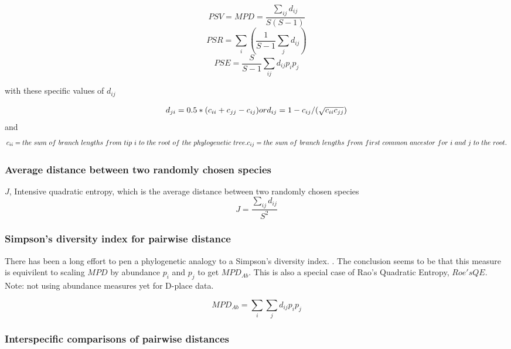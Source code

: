\documentclass[]{book}
\theoremstyle{definition}
\theoremstyle{definition}
\theoremstyle{remark}
\begin{document}
\[PSV = MPD = \dfrac{\sum_{ij} d_{ij}}{S(S-1)}\]
\[PSR = \sum_{i} {(\dfrac{1}{S-1} \sum_{j} {d_{ij}})}\]
\[PSE = \dfrac{S}{S-1} \sum_{ij} d_{ij}p_{i}p_{j}\]

with these specific values of \(d_{ij}\)

\[
d_{ji}=0.5*(c_{ii} + c_{jj} - c_{ij}) \\ 
\ \\
or \\
\ \\
d_{ij} = 1 - c_{ij} / (\sqrt{c_{ii}c_{jj}}) 
\] and \[
c_{ii} = the \ sum \ of \ branch \ lengths \ from \ tip \ i  \ to \ the \ root \ of \ the \ phylogenetic \ tree. \\
\ \\
c_{ij} = the \ sum \  of \ branch \ lengths \ from \ first \ common \ ancestor \ for \ i \ and \ j \ to \ the \ root.
\]

\subsubsection{Average distance between two randomly chosen
species}\label{average-distance-between-two-randomly-chosen-species}

\(J\), Intensive quadratic entropy, which is the average distance
between two randomly chosen species \citep{Izsak2000}
\[J = \dfrac{\sum_{ij}d_{ij}}{S^2} \]

\subsubsection{Simpson's diversity index for pairwise
distance}\label{simpsons-diversity-index-for-pairwise-distance}

There has been a long effort to pen a phylogenetic analogy to a
Simpson's diversity index.
\citep{Rao1982, Clarke1998, Pavoine2005, Hardy2007, Webb2002, Webb2008, Kembel2010}.
The conclusion seems to be that this measure is equivilent to scaling
\(MPD\) by abundance \(p_{i}\) and \(p_{j}\) to get \(MPD_{Ab}\). This
is also a special case of Rao's Quadratic Entropy, \(Roe's QE\). Note:
not using abundance measures yet for D-place data.

\[MPD_{Ab} = \sum_{i} \sum_{j} d_{ij} p_{i} p_{j}\]

\subsubsection{Interspecific comparisons of pairwise
distances}\label{interspecific-comparisons-of-pairwise-distances}
\end{document}
